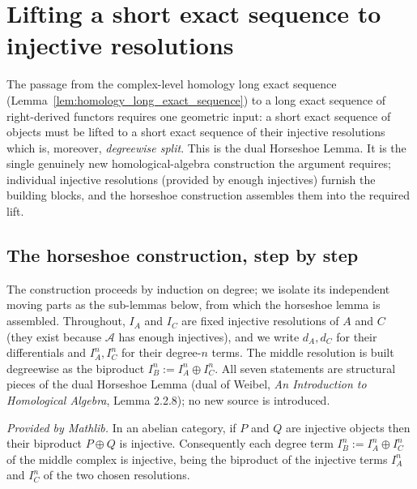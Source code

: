 \section{Lifting a short exact sequence to injective resolutions}

The passage from the complex-level homology long exact sequence
(Lemma~\ref{lem:homology_long_exact_sequence}) to a long exact sequence of
right-derived functors requires one geometric input: a short exact sequence of
objects must be lifted to a short exact sequence of their injective resolutions
which is, moreover, \emph{degreewise split}. This is the dual Horseshoe Lemma. It is the single genuinely new homological-algebra construction the argument
requires; individual injective resolutions (provided by enough injectives) furnish
the building blocks, and the horseshoe construction assembles them into the required
lift.

\subsection{The horseshoe construction, step by step}

The construction proceeds by induction on degree; we isolate its independent moving
parts as the sub-lemmas below, from which the horseshoe lemma is assembled. Throughout,
\(I_A\) and \(I_C\) are fixed injective resolutions of \(A\) and \(C\) (they exist
because \(\mathcal{A}\) has enough injectives), and we write
\(d_A, d_C\) for their differentials and \(I_A^n, I_C^n\) for their degree-\(n\) terms.
The middle resolution is built degreewise as the biproduct
\(I_B^n := I_A^n \oplus I_C^n\). All seven statements are structural pieces of the dual
Horseshoe Lemma (dual of Weibel, \emph{An Introduction to Homological Algebra}, Lemma
2.2.8); no new source is introduced.

\begin{lemma}
  \label{lem:horseshoe_biprod_injective}
  \mathlibok
  \textit{Provided by Mathlib.}
  In an abelian category, if \(P\) and \(Q\) are injective objects then their biproduct
  \(P \oplus Q\) is injective. Consequently each degree term
  \(I_B^n := I_A^n \oplus I_C^n\) of the middle complex is injective, being the
  biproduct of the injective terms \(I_A^n\) and \(I_C^n\) of the two chosen
  resolutions.
\end{lemma}

